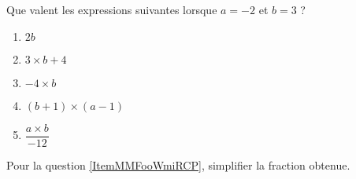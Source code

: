 
\begin{exercice}\label{exosmath-0896}

    Que valent les expressions suivantes lorsque \( a=-2\) et \( b=3\) ?
    \begin{multicols}{2}
        \begin{enumerate}
            \item
                \( 2b\)
            \item
                \( 3\times b+4\)
            \item
                \(  -4\times b\)
            \item
                \( (b+1)\times (a-1)\)
            \item   \label{ItemMMFooWmiRCP}
                \( \dfrac{ a\times b }{ -12 }\)
        \end{enumerate}
    \end{multicols}
    Pour la question \ref{ItemMMFooWmiRCP}, simplifier la fraction obtenue.

\end{exercice}
